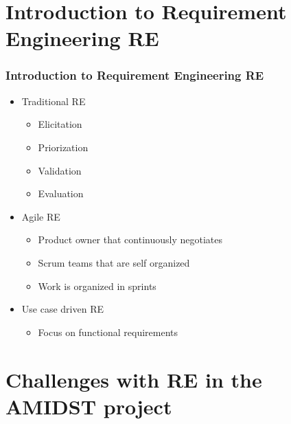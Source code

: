 \documentclass{beamer}
\begin{document}
\section{Introduction to Requirement Engineering RE}

\begin{frame} \frametitle{Introduction to Requirement Engineering RE} 
\vspace{-1cm}

\begin{itemize}
\item<1-> Traditional RE
\begin{itemize}
\item<1-> Elicitation
\item<1-> Priorization
\item<1-> Validation
\item<1-> Evaluation
\end{itemize}
\item<2-> Agile RE
\begin{itemize}
\item<2-> Product owner that continuously negotiates
\item<2-> Scrum teams that are self organized
\item<2-> Work is organized in sprints
\end{itemize}
\item<3-> Use case driven RE
\begin{itemize}
\item<3-> Focus on functional requirements
\end{itemize}
\end{itemize}

\end{frame}


\section{Challenges with RE in the AMIDST project}
\end{document}
